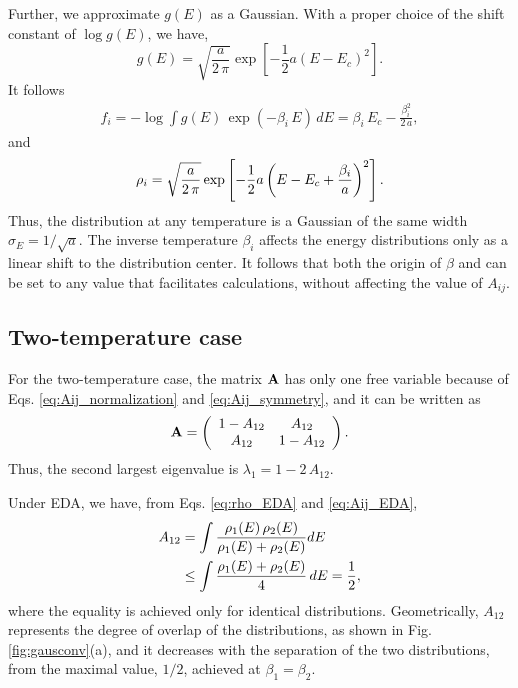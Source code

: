 \documentclass[reprint,aip,jcp,superscriptaddress]{revtex4-1}
\begin{document}
Further, we approximate $g(E)$
as a Gaussian.
%
With a proper choice of the shift constant of
$\log g(E)$, we have,
%
\begin{equation}
g(E)
=
\sqrt{
  \frac{ a } { 2 \, \pi }
}
\exp\left[ -\frac 1 2 a (E - E_c)^2 \right].
\label{eq:gE_Gaussian}
\end{equation}
%
It follows
%
\begin{align}
f_i
=
-\log
\int
g(E) \, \exp(-\beta_i \, E) \, dE
=
\beta_i \, E_c - \frac{ \beta_i^2 }{ 2 \, a },
\label{eq:f_Gaussian}
\end{align}
%
and
\begin{align}
\rho_i
=
\sqrt{ \frac a { 2 \, \pi} }
\exp\left[
  -\frac 1 2
  a \left(
    E - E_c + \frac { \beta_i } { a }
  \right)^2
\right].
\notag
\end{align}
%
Thus,
the distribution at any temperature
is a Gaussian of the same width
$\sigma_E = 1/\sqrt{a}$.
%
The inverse temperature $\beta_i$
affects the energy distributions
only as a linear shift
to the distribution center.
%
It follows that both the origin of $\beta$
and 
can be set to any value
that facilitates calculations,
without affecting the value of $A_{ij}$.



\subsection{Two-temperature case}



For the two-temperature case,
the matrix $\mathbf{A}$ has only one free variable
because of Eqs. \eqref{eq:Aij_normalization}
and \eqref{eq:Aij_symmetry},
and it can be written as
%
\begin{align*}
\mathbf{A}
=
\left(
\begin{array}{ccc}
  1 - A_{12} & A_{12} \\
  A_{12}     & 1 - A_{12}
\end{array}
\right).
\end{align*}
%
Thus,
the second largest eigenvalue is
$\lambda_1 = 1 - 2 \, A_{12}$.



Under EDA,
we have, from
Eqs. \eqref{eq:rho_EDA} and \eqref{eq:Aij_EDA},
%
\begin{align}
A_{12}
&=
\int
\frac{ \rho_1(E) \, \rho_2(E) }
{ \rho_1(E) + \rho_2(E) }
dE
\notag \\
&\le
\int
\frac{ \rho_1(E) + \rho_2(E) }
{ 4 }
\, dE
= \frac 1 2,
\notag
\end{align}
where
the equality is achieved
only for identical distributions.
%
Geometrically,
$A_{12}$
represents the degree of overlap
of the distributions,
as shown in Fig. \ref{fig:gausconv}(a),
%
and it decreases
with the separation
of the two distributions,
from the maximal value, $1/2$,
achieved at $\beta_1 = \beta_2$.
\end{document}
